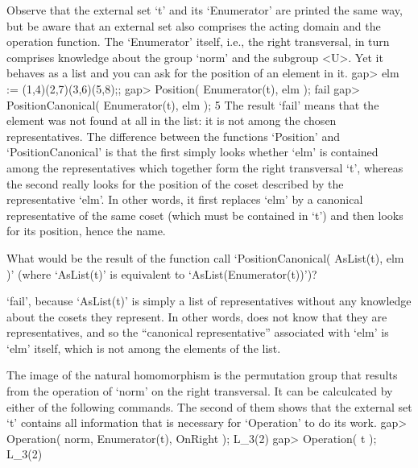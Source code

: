 Observe that  the external set `t'  and its `Enumerator' are  printed the
same way, but be aware  that an external   set also comprises the  acting
domain and  the operation  function.  The `Enumerator'  itself, i.e., the
right transversal, in turn comprises knowledge about the group `norm' and
the  subgroup <U>. Yet  it  behaves as a   list and you   can ask for the
position of an element in it.
\beginexample
    gap> elm := (1,4)(2,7)(3,6)(5,8);;
    gap> Position( Enumerator(t), elm );
    fail
    gap> PositionCanonical( Enumerator(t), elm );
    5
\endexample
{}%
The result `fail'  means that  the element was   not found at  all in the
list: it is not among the chosen  representatives. The difference between
the functions `Position' and `PositionCanonical' is that the first simply
looks whether `elm' is contained among the representatives which together
form the  right transversal `t', whereas  the second really looks for the
position  of the coset  described by  the representative  `elm'. In other
words, it first replaces `elm' by a canonical  representative of the same
coset (which must be contained in  `t') and then  looks for its position,
hence the name.

\exercise   What   would     be  the  result    of   the  function   call
`PositionCanonical( AsList(t), elm )' (where `AsList(t)' is equivalent to
`AsList(Enumerator(t))')?

\answer `fail', because `AsList(t)'  is simply a list of  representatives
without  any knowledge about the  cosets  they represent. In other words,
{\GAP}    does not  know  that  they   are   representatives, and so  the
``canonical representative'' associated with `elm' is `elm' itself, which
is not among the elements of the list.

The  image  of the natural  homomorphism   is the permutation  group that
results from the operation of `norm' on the right  transversal. It can be
calculcated by either of the following commands. The second of them shows
that the external set `t' contains all information  that is necessary for
`Operation' to do its work.
\beginexample
    gap> Operation( norm, Enumerator(t), OnRight );
    L_3(2)
    gap> Operation( t );
    L_3(2)
\endexample

%  

